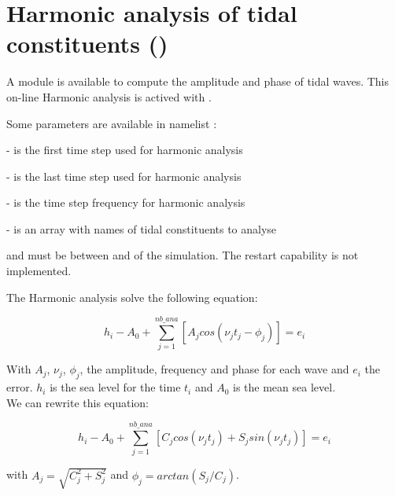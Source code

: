 \documentclass[../main/NEMO_manual]{subfiles}
\begin{document}
\section[Harmonic analysis of tidal constituents (\texttt{\textbf{key\_diaharm}})]{Harmonic analysis of tidal constituents (\protect{})}
\label{sec:DIA_diag_harm}

\begin{listing}
  \caption{}
  \label{lst:nam_diaharm}
\end{listing}

A module is available to compute the amplitude and phase of tidal waves.
This on-line Harmonic analysis is actived with .

Some parameters are available in namelist :

 -  is the first time step used for harmonic analysis

 -  is the  last time step used for harmonic analysis

 -   is the  time step frequency for harmonic analysis


 -        is an array with names of tidal constituents to analyse

  and  must be between  and  of the simulation.
 The restart capability is not implemented.

 The Harmonic analysis solve the following equation:

 \[
   h_{i} - A_{0} + \sum^{nb\_ana}_{j=1}[A_{j}cos(\nu_{j}t_{j}-\phi_{j})] = e_{i}
 \]

With $A_{j}$, $\nu_{j}$, $\phi_{j}$, the amplitude, frequency and phase for each wave and $e_{i}$ the error.
$h_{i}$ is the sea level for the time $t_{i}$ and $A_{0}$ is the mean sea level. \\
We can rewrite this equation:

\[
  h_{i} - A_{0} + \sum^{nb\_ana}_{j=1}[C_{j}cos(\nu_{j}t_{j})+S_{j}sin(\nu_{j}t_{j})] = e_{i}
\]

with $A_{j}=\sqrt{C^{2}_{j}+S^{2}_{j}}$ and $\phi_{j}=arctan(S_{j}/C_{j})$.
\end{document}
